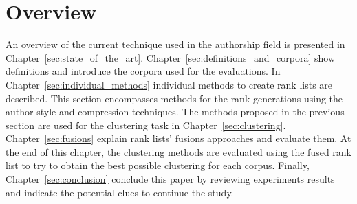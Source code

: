 \section{Overview}

An overview of the current technique used in the authorship field is presented in Chapter~\ref{sec:state_of_the_art}.
Chapter~\ref{sec:definitions_and_corpora} show definitions and introduce the corpora used for the evaluations.
In Chapter~\ref{sec:individual_methods} individual methods to create rank lists are described.
This section encompasses methods for the rank generations using the author style and compression techniques.
The methods proposed in the previous section are used for the clustering task in Chapter~\ref{sec:clustering}.
Chapter~\ref{sec:fusions} explain rank lists' fusions approaches and evaluate them.
At the end of this chapter, the clustering methods are evaluated using the fused rank list to try to obtain the best possible clustering for each corpus.
Finally, Chapter~\ref{sec:conclusion} conclude this paper by reviewing experiments results and indicate the potential clues to continue the study.
